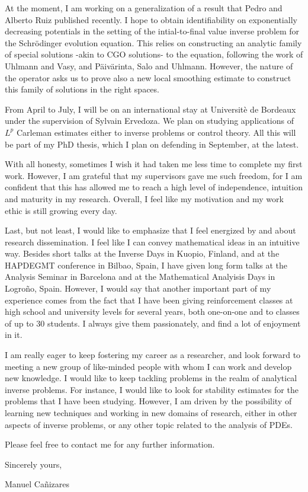 \documentclass{article}
\begin{document}
At the moment, I am working on a generalization of a result that Pedro and Alberto Ruiz published recently. I hope to obtain identifiability on exponentially decreasing potentials in the setting of the intial-to-final value inverse problem for the Schr\"odinger evolution equation. This relies on constructing an analytic family of special solutions -akin to CGO solutions- to the equation, following the work of Uhlmann and Vasy, and P\"aiv\"arinta, Salo and Uhlmann. However, the nature of the operator asks us to prove also a new local smoothing estimate to construct this family of solutions in the right spaces.

From April to July, I will be on an international stay at Universit\`{e} de Bordeaux under the supervision of Sylvain Ervedoza. We plan on studying applications of $L^p$ Carleman estimates either to inverse problems or control theory. All this will be part of my PhD thesis, which I plan on defending in September, at the latest.

With all honesty, sometimes I wish it had taken me less time to complete my first work. However, I am grateful that my supervisors gave me such freedom, for I am confident that this has allowed me to reach a high level of independence, intuition and maturity in my research. Overall, I feel like my motivation and my work ethic is still growing every day.

Last, but not least, I would like to emphasize that I feel energized by and about research dissemination. I feel like I can convey mathematical ideas in an intuitive way. Besides short talks at the Inverse Days in Kuopio, Finland, and at the HAPDEGMT conference in Bilbao, Spain, I have given long form talks at the Analysis Seminar in Barcelona and at the Mathematical Analyisis Days in Logro\~no, Spain. However, I would say that another important part of my experience comes from the fact that I have been giving reinforcement classes at high school and university levels for several years, both one-on-one and to classes of up to 30 students. I always give them passionately, and find a lot of enjoyment in it.

I am really eager to keep fostering my career as a researcher, and look forward to meeting a new group of like-minded people with whom I can work and develop new knowledge. I would like to keep tackling problems in the realm of analytical inverse problems. For instance, I would like to look for stability estimates for the problems that I have been studying. However, I am driven by the possibility of learning new techniques and working in new domains of research, either in other aspects of inverse problems, or any other topic related to the analysis of PDEs.

Please feel free to contact me for any further information.
\bigskip %

Sincerely yours,


Manuel Ca\~{n}izares\\
\end{document}
